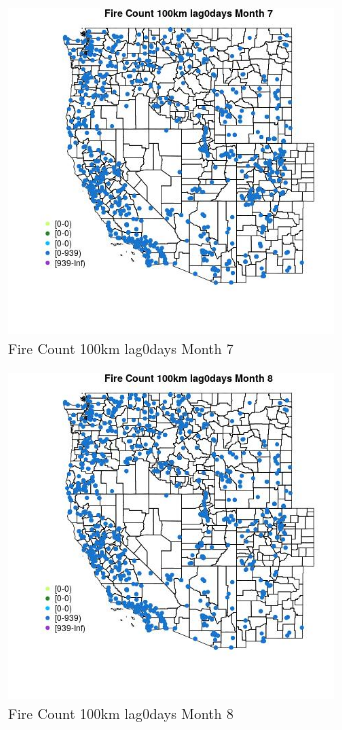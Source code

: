 \begin{figure} 
\centering  
\includegraphics[width=0.77\textwidth]{Code_Outputs/Report_ML_input_PM25_Step4_part_e_de_duplicated_aves_compiled_2019-05-21wNAs_MapObsMo7Fire_Count_100km_lag0days.jpg} 
\caption{\label{fig:Report_ML_input_PM25_Step4_part_e_de_duplicated_aves_compiled_2019-05-21wNAsMapObsMo7Fire_Count_100km_lag0days}Fire Count 100km lag0days Month 7} 
\end{figure} 
 

\begin{figure} 
\centering  
\includegraphics[width=0.77\textwidth]{Code_Outputs/Report_ML_input_PM25_Step4_part_e_de_duplicated_aves_compiled_2019-05-21wNAs_MapObsMo8Fire_Count_100km_lag0days.jpg} 
\caption{\label{fig:Report_ML_input_PM25_Step4_part_e_de_duplicated_aves_compiled_2019-05-21wNAsMapObsMo8Fire_Count_100km_lag0days}Fire Count 100km lag0days Month 8} 
\end{figure} 
 

